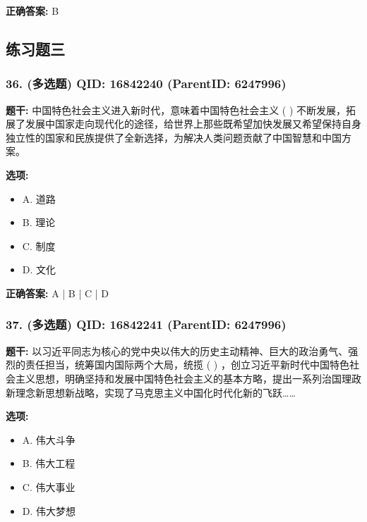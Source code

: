 \documentclass[12pt,UTF8]{ctexart}
\begin{document}
\textbf{正确答案:}
B

\vspace{0.3em}\hrulefill\vspace{0.7em}

\subsection*{练习题三}

\subsubsection*{36. (多选题) \small QID: 16842240 (ParentID: 6247996)}

\textbf{题干:}
中国特色社会主义进入新时代，意味着中国特色社会主义 ( ) 不断发展，拓展了发展中国家走向现代化的途径，给世界上那些既希望加快发展又希望保持自身独立性的国家和民族提供了全新选择，为解决人类问题贡献了中国智慧和中国方案。



\textbf{选项:}
\begin{itemize}[leftmargin=*]

  \item A. 道路

  \item B. 理论

  \item C. 制度

  \item D. 文化

\end{itemize}

\textbf{正确答案:}
A | B | C | D

\vspace{0.3em}\hrulefill\vspace{0.7em}

\subsubsection*{37. (多选题) \small QID: 16842241 (ParentID: 6247996)}

\textbf{题干:}
以习近平同志为核心的党中央以伟大的历史主动精神、巨大的政治勇气、强烈的责任担当，统筹国内国际两个大局，统揽 ( ) ，创立习近平新时代中国特色社会主义思想，明确坚持和发展中国特色社会主义的基本方略，提出一系列治国理政新理念新思想新战略，实现了马克思主义中国化时代化新的飞跃……



\textbf{选项:}
\begin{itemize}[leftmargin=*]

  \item A. 伟大斗争

  \item B. 伟大工程

  \item C. 伟大事业

  \item D. 伟大梦想

\end{itemize}
\end{document}
